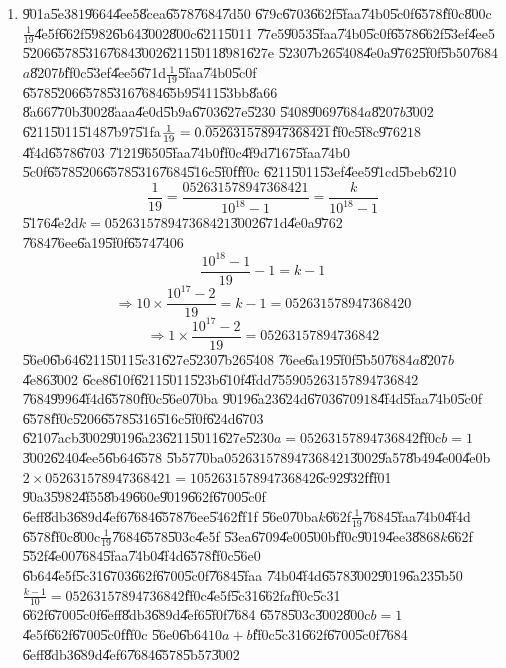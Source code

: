 \documentclass{article}
\begin{document}
\begin{enumerate}
\item \U{901a}\U{5e38}$1$\U{9664}\U{4ee5}\U{8cea}\U{6578}\U{7684}\U{7d50}%
\U{679c}\U{6703}\U{662f}\U{5faa}\U{74b0}\U{5c0f}\U{6578}\U{ff0c}\U{800c}$%
\frac{1}{19}$\U{4e5f}\U{662f}\U{5982}\U{6b64}\U{3002}\U{800c}\U{6211}\U{5011}%
\U{77e5}\U{9053}\U{5faa}\U{74b0}\U{5c0f}\U{6578}\U{662f}\U{53ef}\U{4ee5}%
\U{5206}\U{6578}\U{5316}\U{7684}\U{3002}\U{6211}\U{5011}\U{8981}\U{627e}%
\U{5230}\U{7b26}\U{5408}\U{4e0a}\U{9762}\U{5f0f}\U{5b50}\U{7684}$a$\U{8207}$b
$\U{ff0c}\U{53ef}\U{4ee5}\U{671d}$\frac{1}{19}$\U{5faa}\U{74b0}\U{5c0f}%
\U{6578}\U{5206}\U{6578}\U{5316}\U{7684}\U{65b9}\U{5411}\U{53bb}\U{8a66}%
\U{8a66}\U{770b}\U{3002}\U{8aaa}\U{4e0d}\U{5b9a}\U{6703}\U{627e}\U{5230}%
\U{5408}\U{9069}\U{7684}$a$\U{8207}$b$\U{3002}\newline
\U{6211}\U{5011}\U{5148}\U{7b97}\U{51fa}$\frac{1}{19}=0.\overline{%
052631578947368421}$\U{ff0c}\U{5f8c}\U{9762}$18$\U{4f4d}\U{6578}\U{6703}%
\U{7121}\U{9650}\U{5faa}\U{74b0}\U{ff0c}\U{4f9d}\U{7167}\U{5faa}\U{74b0}%
\U{5c0f}\U{6578}\U{5206}\U{6578}\U{5316}\U{7684}\U{516c}\U{5f0f}\U{ff0c}%
\U{6211}\U{5011}\U{53ef}\U{4ee5}\U{91cd}\U{5beb}\U{6210}%
\[
\frac{1}{19}=\frac{052631578947368421}{10^{18}-1}=\frac{k}{10^{18}-1}
\]%
\U{5176}\U{4e2d}$k=052631578947368421$\U{3002}\U{671d}\U{4e0a}\U{9762}%
\U{7684}\U{76ee}\U{6a19}\U{5f0f}\U{6574}\U{7406}%
\[
\frac{10^{18}-1}{19}-1=k-1
\]%
\[
\Rightarrow 10\times \frac{10^{17}-2}{19}=k-1=052631578947368420
\]%
\[
\Rightarrow 1\times \frac{10^{17}-2}{19}=05263157894736842
\]%
\U{56e0}\U{6b64}\U{6211}\U{5011}\U{5c31}\U{627e}\U{5230}\U{7b26}\U{5408}%
\U{76ee}\U{6a19}\U{5f0f}\U{5b50}\U{7684}$a$\U{8207}$b$\U{4e86}\U{3002}%
\U{6ce8}\U{610f}\U{6211}\U{5011}\U{523b}\U{610f}\U{4fdd}\U{7559}$%
05263157894736842$\U{7684}\U{9996}\U{4f4d}\U{6578}$0$\U{ff0c}\U{56e0}\U{70ba}%
\U{9019}\U{6a23}\U{624d}\U{6703}\U{6709}$18$\U{4f4d}\U{5faa}\U{74b0}\U{5c0f}%
\U{6578}\U{ff0c}\U{5206}\U{6578}\U{5316}\U{516c}\U{5f0f}\U{624d}\U{6703}%
\U{6210}\U{7acb}\U{3002}\U{9019}\U{6a23}\U{6211}\U{5011}\U{627e}\U{5230}$%
a=05263157894736842$\U{ff0c}$b=1$\U{3002}\U{6240}\U{4ee5}\U{6b64}\U{6578}%
\U{5b57}\U{70ba}$052631578947368421$\U{3002}\U{9a57}\U{8b49}\U{4e00}\U{4e0b}$%
2\times 052631578947368421=105263157894736842$\U{6c92}\U{932f}\U{ff01}%
\newline
\U{90a3}\U{5982}\U{4f55}\U{8b49}\U{660e}\U{9019}\U{662f}\U{6700}\U{5c0f}%
\U{6eff}\U{8db3}\U{689d}\U{4ef6}\U{7684}\U{6578}\U{76ee}\U{5462}\U{ff1f}%
\U{56e0}\U{70ba}$k$\U{662f}$\frac{1}{19}$\U{7684}\U{5faa}\U{74b0}\U{4f4d}%
\U{6578}\U{ff0c}\U{800c}$\frac{1}{19}$\U{7684}\U{6578}\U{503c}\U{4e5f}%
\U{53ea}\U{6709}\U{4e00}\U{500b}\U{ff0c}\U{9019}\U{4ee3}\U{8868}$k$\U{662f}%
\U{552f}\U{4e00}\U{7684}\U{5faa}\U{74b0}\U{4f4d}\U{6578}\U{ff0c}\U{56e0}%
\U{6b64}\U{4e5f}\U{5c31}\U{6703}\U{662f}\U{6700}\U{5c0f}\U{7684}\U{5faa}%
\U{74b0}\U{4f4d}\U{6578}\U{3002}\U{9019}\U{6a23}\U{5b50}$\frac{k-1}{10}%
=05263157894736842$\U{ff0c}\U{4e5f}\U{5c31}\U{662f}$a$\U{ff0c}\U{5c31}%
\U{662f}\U{6700}\U{5c0f}\U{6eff}\U{8db3}\U{689d}\U{4ef6}\U{5f0f}\U{7684}%
\U{6578}\U{503c}\U{3002}\U{800c}$b=1$\U{4e5f}\U{662f}\U{6700}\U{5c0f}\U{ff0c}%
\U{56e0}\U{6b64}$10a+b$\U{ff0c}\U{5c31}\U{662f}\U{6700}\U{5c0f}\U{7684}%
\U{6eff}\U{8db3}\U{689d}\U{4ef6}\U{7684}\U{6578}\U{5b57}\U{3002}


\end{enumerate}
\end{document}
